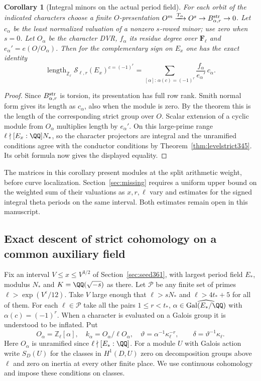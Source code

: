 \documentclass[a4paper,11pt]{article}
\newtheorem{corollary}[proposition]{Corollary}
\theoremstyle{definition}
\theoremstyle{remark}
\newcommand{\ZZ}{\mathbb Z}\newcommand{\ord}{\operatorname{ord}}
\numberwithin{equation}{section}
\begin{document}
\begin{corollary}[Integral minors on the actual period field]\leavevmode
\label{cor:strictminors415}
For each orbit of the indicated characters choose a finite
\(O\)-presentation \(O^m\xrightarrow{T_\alpha}O^s\to
B_{\alpha,r}^{\rm str}\to0\). Let \(c_\alpha\) be the
least normalized valuation of a nonzero \(s\)-rowed minor;
use zero when \(s=0\). Let \(O_\alpha\) be the character
DVR, \(f_\alpha\) its residue degree over \(\mathbf F_\ell\)
and \(e_\alpha'=e(O/O_\alpha)\). Then for the complementary
sign on \(E_x\) one has the exact identity
\[
 \operatorname{length}_{\ZZ_\ell}
     \mathcal S_{\ell,r}(E_x)^{c=(-1)^r}
       =\sum_{[\alpha]:\,\alpha(c)=(-1)^r}
                        \frac{f_\alpha}{e_\alpha'}\,c_\alpha .
\]
\end{corollary}
\begin{proof}
Since \(B_{\alpha,r}^{\rm str}\) is torsion, its presentation
has full row rank. Smith normal form gives its length
as \(c_\alpha\), also when the module is zero. By the theorem
this is the length of the corresponding strict group over
\(O\). Scalar extension of a cyclic module from
\(O_\alpha\) multiplies length by \(e_\alpha'\). On this
large-prime range \(\ell\nmid [E_x:\QQ]N_*\), so the
character projectors are integral and the unramified
conditions agree with the conductor conditions by
Theorem~\ref{thm:levelstrict345}. Its orbit formula now
gives the displayed equality.
\end{proof}

The matrices in this corollary present modules at the split
arithmetic weight, before curve localization. Section~\ref{sec:missing}
requires a uniform upper bound on the weighted sum of their
valuations as \(x,r,\ell\) vary and estimates for the signed
integral theta periods on the same interval. Both estimates
remain open in this manuscript.


\subsection{Exact descent of strict cohomology on a common auxiliary field}
\label{sec:strictcommonbase416}

Fix an interval \(V\le x\le V^{3/2}\) of Section~\ref{sec:seed361},
with largest period field \(E_*\), modulus \(N_*\) and
\(K=\QQ(\sqrt{-s})\) as there. Let \(\mathcal P\) be any finite set
of primes \(\ell>\exp(V^\varepsilon/12)\). Take \(V\) large enough
that \(\ell>sN_*\) and \(\ell>4t_*+5\) for all of them.
For each \(\ell\in\mathcal P\) take all the pairs \(1\le r<t_*\),
\(\alpha\in\widehat{\operatorname{Gal}(E_*/\QQ)}\) with
\(\alpha(c)=(-1)^r\). When a character is evaluated on a Galois
group it is understood to be inflated. Put
\[
 O_\alpha=\ZZ_\ell[\alpha],\quad
 k_\alpha=O_\alpha/\ell O_\alpha,\quad
 \vartheta=\alpha^{-1}\kappa_\ell^{-r},\qquad
 \delta=\vartheta^{-1}\kappa_\ell .
\]
Here \(O_\alpha\) is unramified since \(\ell\nmid[E_*:\QQ]\).
For a module \(U\) with Galois action write \(S_D(U)\) for the
classes in \(H^1(D,U)\) zero on decomposition groups above \(\ell\)
and zero on inertia at every other finite place. We use continuous
cohomology and impose these conditions on classes.
\end{document}
